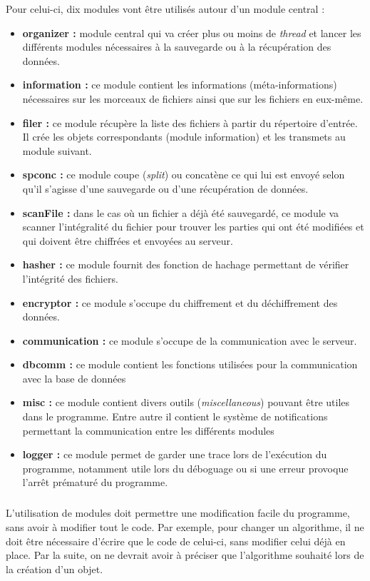 \documentclass[a4paper,10pt, twoside]{report}
\begin{document}
\begin{spacing}{1.2}
Pour celui-ci, dix modules vont être utilisés autour d'un module central :
\begin{itemize}
  \item \textbf{organizer :} module central qui va créer plus ou moins de
  \textit{thread} et lancer les différents modules nécessaires à la
  sauvegarde ou à la récupération des données.
  \item \textbf{information :} ce module contient les informations
  (méta-informations) nécessaires sur les morceaux de fichiers ainsi que
  sur les fichiers en eux-même.
  \item \textbf{filer :} ce module récupère la liste des fichiers à
  partir du répertoire d'entrée. Il crée les objets correspondants
  (module information) et les transmets au module suivant.
  \item \textbf{spconc :} ce module coupe (\textit{split}) ou concatène ce
  qui lui est envoyé selon qu'il s'agisse d'une sauvegarde ou d'une
  récupération de données.
  \item \textbf{scanFile :} dans le cas où un fichier a déjà été
  sauvegardé, ce module va scanner l'intégralité du fichier pour trouver
  les parties qui ont été modifiées et qui doivent être chiffrées et
  envoyées au serveur.
  \item \textbf{hasher :} ce module fournit des fonction de hachage permettant
  de vérifier l'intégrité des fichiers.
  \item \textbf{encryptor :} ce module s'occupe du chiffrement et du
  déchiffrement des données.
  \item \textbf{communication :} ce module s'occupe de la communication avec
  le serveur.
  \item \textbf{dbcomm :} ce module contient les fonctions utilisées pour la
  communication avec la base de données
  \item \textbf{misc :} ce module contient divers outils
  (\textit{miscellaneous}) pouvant être utiles dans le programme. Entre autre
  il contient le système de notifications permettant la communication entre
  les différents modules
  \item \textbf{logger :} ce module permet de garder une trace lors de
  l'exécution du programme, notamment utile lors du déboguage ou si une
  erreur provoque l'arrêt prématuré du programme.
\end{itemize}

\subparagraph{}
L'utilisation de modules doit permettre une modification facile du programme,
sans avoir à modifier tout le code. Par exemple, pour changer un algorithme,
il ne doit être nécessaire d'écrire que le code de celui-ci, sans
modifier celui déjà en place. Par la suite, on ne devrait avoir à
préciser que l'algorithme souhaité lors de la création d'un objet.


\end{spacing}
\end{document}
